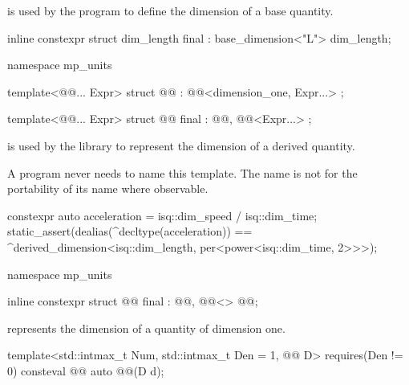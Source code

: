 \pnum
{} is used by the program
to define the dimension of a base quantity.
\begin{example}
\begin{codeblock}
inline constexpr struct dim_length final : base_dimension<"L"> {} dim_length;
\end{codeblock}
\end{example}

\begin{codeblock}
namespace mp_units {

template<@@... Expr>
struct @@ : @@<dimension_one, Expr...> {};

template<@@... Expr>
struct @@ final : @@, @@<Expr...> {};

}
\end{codeblock}

\pnum
{} is used by the library
to represent the dimension of a derived quantity.
\begin{note}
A program never needs to name this template.
The name is not \expos{} for the portability of its name where observable.
\end{note}
\begin{example}
\begin{codeblock}
constexpr auto acceleration = isq::dim_speed / isq::dim_time;
static_assert(dealias(^decltype(acceleration)) ==
              ^derived_dimension<isq::dim_length, per<power<isq::dim_time, 2>>>);
\end{codeblock}
\end{example}

\begin{codeblock}
namespace mp_units {

inline constexpr struct @@ final : @@, @@<> {
} @@;

}
\end{codeblock}

\pnum
{} represents the dimension of a quantity of dimension one.

\begin{itemdecl}
template<std::intmax_t Num, std::intmax_t Den = 1, @@ D>
  requires(Den != 0)
consteval @@ auto @@(D d);
\end{itemdecl}

